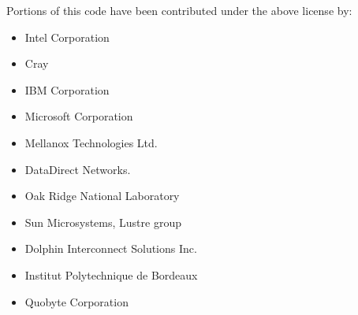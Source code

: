 \documentclass[a4paper, 12pt]{article}
\begin{document}
Portions of this code have been contributed under the above license by:

\begin{itemize}
  \item Intel Corporation
  \item Cray
  \item IBM Corporation
  \item Microsoft Corporation
  \item Mellanox Technologies Ltd.
  \item DataDirect Networks.
  \item Oak Ridge National Laboratory
  \item Sun Microsystems, Lustre group
  \item Dolphin Interconnect Solutions Inc.
  \item Institut Polytechnique de Bordeaux
  \item Quobyte Corporation
\end{itemize}
\end{document}
